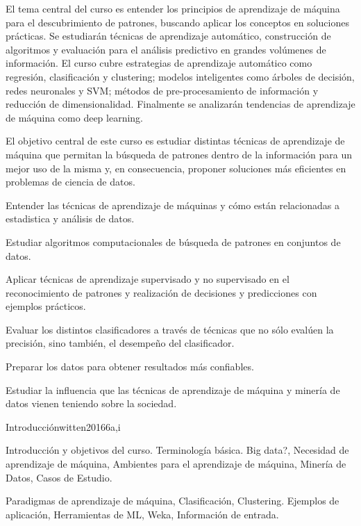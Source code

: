 \begin{syllabus}


\begin{justification}

El tema central del curso es entender los principios de aprendizaje de máquina para el descubrimiento de patrones, buscando aplicar los conceptos en soluciones prácticas. Se estudiarán técnicas de aprendizaje automático, construcción de algoritmos y evaluación para el análisis predictivo en grandes volúmenes de información. El curso cubre estrategias de aprendizaje automático como regresión, clasificación y clustering; modelos inteligentes como árboles de decisión, redes neuronales y SVM; métodos de pre-procesamiento de información y reducción de dimensionalidad. Finalmente se analizarán tendencias de aprendizaje de máquina como deep learning.
\end{justification}

\begin{goals}
\item El objetivo central de este curso es estudiar distintas técnicas de aprendizaje de máquina que permitan la búsqueda de patrones 
      dentro de la información para un mejor uso de la misma y, en consecuencia, proponer soluciones más eficientes en problemas de ciencia de datos.
\item Entender las técnicas de aprendizaje de máquinas y cómo están relacionadas a estadistica  y análisis de datos.
\item Estudiar algoritmos computacionales de búsqueda de patrones en conjuntos de datos.
\item Aplicar técnicas de aprendizaje supervisado y no supervisado en el reconocimiento de patrones y realización de decisiones y predicciones con ejemplos prácticos.
\item Evaluar los distintos clasificadores a través de técnicas que no sólo evalúen la precisión, sino también, el desempeño del clasificador.
\item Preparar los datos para obtener resultados más confiables.
\item Estudiar la influencia que las técnicas de aprendizaje de máquina y minería de datos vienen teniendo sobre la sociedad.
\end{goals}

\begin{unit}{Introducción}{}{witten2016}{6}{a,i}
\begin{topics}
      \item Introducción y objetivos del curso. Terminología básica. Big data?, Necesidad de aprendizaje de máquina, Ambientes para el aprendizaje de máquina, Minería de Datos, Casos de Estudio. 
      \item Paradigmas de aprendizaje de máquina, Clasificación, Clustering. Ejemplos de aplicación, Herramientas de ML, Weka, Información de entrada.
   \end{topics}


\end{unit}
\end{syllabus}
